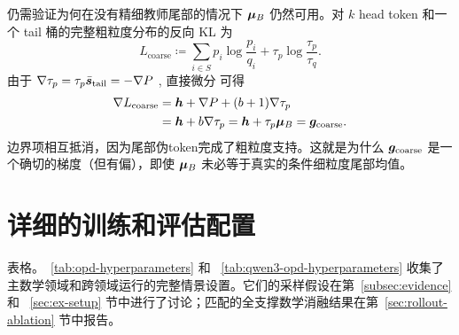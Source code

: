 仍需验证为何在没有精细教师尾部的情况下 $\bm{\mu}_B$ 仍然可用。对 $k$  head token 和一个 tail 桶的完整粗粒度分布的反向 KL 为
\begin{equation}
 L_{\mathrm{coarse}}
 \coloneqq
 \sum_{i\in S}p_i\log\frac{p_i}{q_i}
 +\tau_p\log\frac{\tau_p}{\tau_q}.
\end{equation}
由于
$\nabla\tau_p=\tau_p\bar{\bm{s}}_{\mathrm{tail}}=-\nabla P$ ,
直接微分
可得
\begin{equation}
 \begin{aligned}
 \nabla L_{\mathrm{coarse}}
 &=\bm{h}+\nabla P+(b+1)\nabla\tau_p\\
 &=\bm{h}+b\nabla\tau_p
  =\bm{h}+\tau_p\bm{\mu}_B
  =\bm{g}_{\mathrm{coarse}}.
 \end{aligned}
\end{equation}
边界项相互抵消，因为尾部伪token完成了粗粒度支持。这就是为什么 $\bm{g}_{\mathrm{coarse}}$ 是一个确切的梯度（但有偏），即使 $\bm{\mu}_B$ 未必等于真实的条件细粒度尾部均值。

\FloatBarrier
\section{详细的训练和评估配置}
\label{app:hyperparameters}


表格。~\ref{tab:opd-hyperparameters} 和 ~\ref{tab:qwen3-opd-hyperparameters} 收集了主数学领域和跨领域运行的完整情景设置。它们的采样假设在第~\ref{subsec:evidence} 和 ~\ref{sec:ex-setup} 节中进行了讨论；匹配的全支撑数学消融结果在第~\ref{sec:rollout-ablation} 节中报告。

